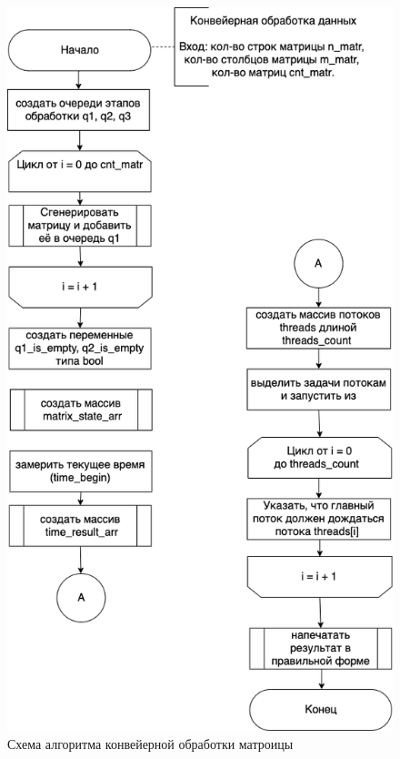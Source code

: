 \documentclass[a4paper,14pt, unknownkeysallowed]{extreport}
\begin{document}
\clearpage

\begin{figure}[h]
	\centering
	\includegraphics[scale=0.6]{img/parallel_processing.png}
	\caption{Схема алгоритма конвейерной обработки матроицы}
	\label{fig:parallel_processing}
\end{figure}

\clearpage
\end{document}
